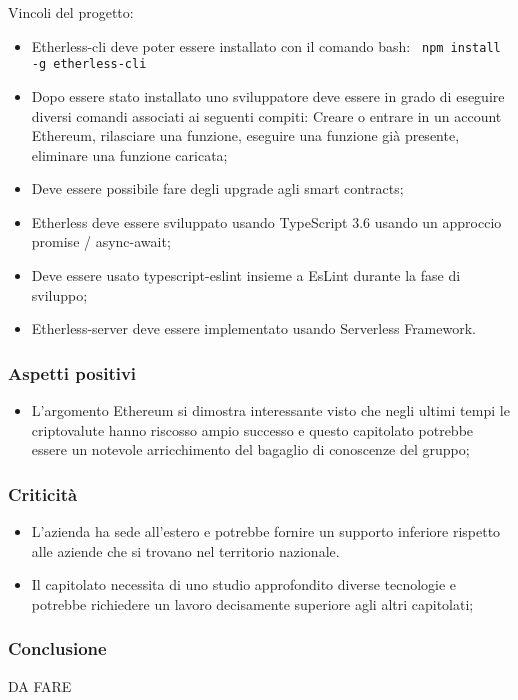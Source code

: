     Vincoli del progetto:
    	   \begin{itemize}
    			\item Etherless-cli deve poter essere installato con il comando bash:  
    			\verb! npm install -g etherless-cli!
    	  
    			\item Dopo essere stato installato uno sviluppatore deve essere in grado di eseguire diversi comandi associati ai seguenti compiti: Creare o entrare in un account Ethereum, rilasciare una funzione, eseguire una funzione già presente, eliminare una funzione caricata;
    			\item Deve essere possibile fare degli upgrade agli smart contracts;
    			\item Etherless deve essere sviluppato usando TypeScript 3.6 usando un approccio  promise / async-await;
    			\item Deve essere usato typescript-eslint insieme a EsLint durante la fase di sviluppo;
    			\item Etherless-server deve essere implementato usando Serverless Framework.
    						
	 \end{itemize}
    
    
    \subsubsection{Aspetti positivi}
	    \begin{itemize}
    			\item L'argomento Ethereum si dimostra interessante visto che negli ultimi tempi le criptovalute hanno riscosso ampio successo e questo capitolato potrebbe essere un notevole arricchimento del bagaglio di conoscenze del gruppo;
    	   \end{itemize}
    \subsubsection{Criticità}
    	   \begin{itemize}
    			\item L'azienda ha sede all'estero e potrebbe fornire un supporto inferiore rispetto alle aziende che si trovano nel territorio nazionale.
    			\item Il capitolato necessita di uno studio approfondito diverse tecnologie e potrebbe richiedere un lavoro decisamente superiore agli altri capitolati;
    	   \end{itemize}
    \subsubsection{Conclusione}
	DA FARE
